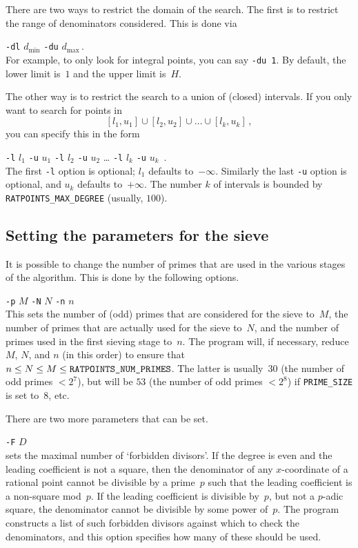 \documentclass[12pt,a4paper,oneside]{amsart}
\begin{document}
There are two ways to restrict the domain of the search. The first is
to restrict the range of denominators considered. This is done via \\
\strut\quad\verb+-dl+ $d_{\text{min}}$ \verb+-du+ $d_{\text{max}}$\,. \\
For example, to only look for integral points, you can say \verb+-du 1+.
By default, the lower limit is~$1$ and the upper limit is~$H$.

The other way is to restrict the search to a union of (closed) intervals.
If you only want to search for points in
\[ [l_1, u_1] \cup [l_2, u_2] \cup \dots \cup [l_k, u_k] \,, \]
you can specify this in the form \\
\strut\quad\verb+-l+ $l_1$ \verb+-u+ $u_1$ \verb+-l+ $l_2$ \verb+-u+ $u_2$ \dots
\verb+-l+ $l_k$ \verb+-u+ $u_k$ \,. \\
The first \verb+-l+ option is optional; $l_1$ defaults to~$-\infty$.
Similarly the last \verb+-u+ option is optional, and $u_k$ defaults
to~$+\infty$. The number $k$ of intervals is bounded by
\texttt{RATPOINTS\_MAX\_DEGREE} (usually, $100$).

\subsection{Setting the parameters for the sieve} \label{fd}

It is possible to change the number of primes that are used in the various
stages of the algorithm. This is done by the following options. \\
\strut\quad\verb+-p+ $M$ \verb+-N+ $N$ \verb+-n+ $n$ \\
This sets the number of (odd) primes that are considered for the sieve
to~$M$, the number of primes that are actually used for the sieve to~$N$,
and the number of primes used in the first sieving stage to~$n$. The program
will, if necessary, reduce $M$, $N$, and $n$ (in this order) to ensure
that $n \le N \le M \le \text{\texttt{RATPOINTS\_NUM\_PRIMES}}$. The latter
is usually~$30$ (the number of odd primes $< 2^7$), but will be $53$
(the number of odd primes $< 2^8$) if \texttt{PRIME\_SIZE} is set to~$8$, etc.

There are two more parameters that can be set. \\
\strut\quad\verb+-F+ $D$ \\
sets the maximal number of `forbidden divisors'. If the degree is even
and the leading coefficient is not a square, then the denominator of
any $x$-coordinate of a rational point cannot be divisible by a prime~$p$
such that the leading coefficient is a non-square mod~$p$. If the leading
coefficient is divisible by~$p$, but not a $p$-adic square, the denominator
cannot be divisible by some power of~$p$. The program constructs a list
of such forbidden divisors against which to check the denominators, and this
option specifies how many of these should be used.
\end{document}
